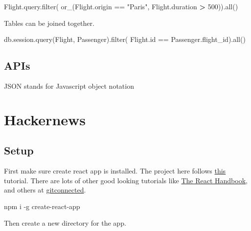 \documentclass[]{book}
\newenvironment{Shaded}{\begin{snugshade}}{\end{snugshade}}
\newcommand{\StringTok}[1]{\textcolor[rgb]{0.31,0.60,0.02}{#1}}
\newcommand{\OperatorTok}[1]{\textcolor[rgb]{0.81,0.36,0.00}{\textbf{#1}}}
\newcommand{\ExtensionTok}[1]{#1}
\newcommand{\NormalTok}[1]{#1}
\begin{document}
\begin{Shaded}
\begin{Highlighting}[]
\ExtensionTok{Flight.query.filter}\NormalTok{(}
    \ExtensionTok{or_}\NormalTok{(Flight.origin == }\StringTok{"Paris"}\NormalTok{,}
        \ExtensionTok{Flight.duration} \OperatorTok{>}\NormalTok{ 500))}\ExtensionTok{.all}\NormalTok{()}
\end{Highlighting}
\end{Shaded}

Tables can be joined together.

\begin{Shaded}
\begin{Highlighting}[]
\ExtensionTok{db.session.query}\NormalTok{(Flight, Passenger)}\ExtensionTok{.filter}\NormalTok{(}
    \ExtensionTok{Flight.id}\NormalTok{ == Passenger.flight_id)}\ExtensionTok{.all}\NormalTok{()}
\end{Highlighting}
\end{Shaded}

\section{APIs}\label{apis}

JSON stands for Javascript object notation

\chapter{Hackernews}\label{hackernews}

\section{Setup}\label{setup-1}

First make sure create react app is installed. The project here follows
\href{https://www.youtube.com/watch?v=oGB_VPrld0U\&list=PLTTC1K14KAxHj6AftnRUD28SQaoVauvl3}{this}
tutorial. There are lots of other good looking tutorials like
\href{https://www.freecodecamp.org/news/the-react-handbook-b71c27b0a795/}{The
React Handbook}, and others at
\href{https://gitconnected.com/learn/react}{gitconnected}.

\begin{Shaded}
\begin{Highlighting}[]
\ExtensionTok{npm}\NormalTok{ i -g create-react-app}
\end{Highlighting}
\end{Shaded}

Then create a new directory for the app.
\end{document}
